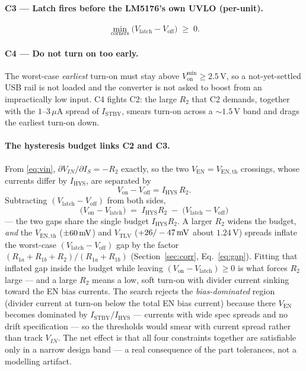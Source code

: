 \documentclass[11pt]{article}
\newcommand{\volt}{\mathrm{V}}\newcommand{\ampere}{\mathrm{A}}
\newcommand{\micro}{\mu}\newcommand{\nano}{\mathrm{n}}
\newcommand{\SI}[2]{\ensuremath{#1\,#2}}
\newcommand{\SIrange}[3]{\ensuremath{#1\text{--}#2\,#3}}
\newcommand{\Ven}{V_{\mathrm{EN}}}
\newcommand{\Vtlv}{V_{\mathrm{TLV}}}
\newcommand{\Vth}{V_{\mathrm{EN,th}}}
\newcommand{\Istby}{I_{\mathrm{STBY}}}
\newcommand{\Ihys}{I_{\mathrm{HYS}}}
\newcommand{\Rone}{R_{1a}}
\newcommand{\Rtwo}{R_{1b}}
\newcommand{\Rt}{R_{2}}
\newcommand{\Von}{V_{\mathrm{on}}}
\newcommand{\Voff}{V_{\mathrm{off}}}
\newcommand{\Vlatch}{V_{\mathrm{latch}}}
\begin{document}
\paragraph{C3 --- Latch fires before the LM5176's own UVLO (per-unit).}
\begin{equation}
\min_{\text{corners}}\big(\Vlatch-\Voff\big)\;\ge\;0 .
\label{eq:c3}
\end{equation}

\paragraph{C4 --- Do not turn on too early.}
The worst-case \emph{earliest} turn-on must stay above
$V_{\mathrm{on}}^{\min}\ge\SI{2.5}{\volt}$, so a not-yet-settled USB rail is not
loaded and the converter is not asked to boost from an impractically low input.
C4 fights C2: the large $\Rt$ that C2 demands, together with the
\SIrange{1}{3}{\micro\ampere} spread of $\Istby$, smears turn-on across a
$\sim$\SI{1.5}{\volt} band and drags the earliest turn-on down.

\paragraph{The hysteresis budget links C2 and C3.}
From \eqref{eq:vin}, $\partial V_{IN}/\partial I_S=-\Rt$ exactly, so the two
$\Ven=\Vth$ crossings, whose currents differ by $\Ihys$, are separated by
\begin{equation}
\Von-\Voff=\Ihys\,\Rt .
\label{eq:hyst}
\end{equation}
Subtracting $(\Vlatch-\Voff)$ from both sides,
\begin{equation}
\boxed{\;\big(\Von-\Vlatch\big)\;=\;\Ihys\Rt\;-\;\big(\Vlatch-\Voff\big)\;}
\label{eq:budget}
\end{equation}
--- the two gaps share the single budget $\Ihys\Rt$. A larger $\Rt$ widens the
budget, \emph{and} the $\Vth$ ($\pm\SI{60}{\milli\volt}$) and $\Vtlv$
($+26/-\SI{47}{\milli\volt}$ about \SI{1.24}{\volt}) spreads inflate the worst-case
$(\Vlatch-\Voff)$ gap by the factor $(\Rone+\Rtwo+\Rt)/(\Rone+\Rtwo)$
(Section~\ref{sec:corr}, Eq.~\eqref{eq:gap}). Fitting that inflated gap inside
the budget while leaving $(\Von-\Vlatch)\ge0$ is what forces $\Rt$ large ---
and a large $\Rt$ means a low, soft turn-on with divider current sinking toward
the EN bias currents. The search rejects the \emph{bias-dominated} region
(divider current at turn-on below the total EN bias current) because there
$\Ven$ becomes dominated by $\Istby/\Ihys$ --- currents with wide spec spreads
and no drift specification --- so the thresholds would smear with current
spread rather than track $V_{IN}$. The net effect is that all four constraints
together are satisfiable only in a narrow design band --- a real consequence of
the part tolerances, not a modelling artifact.
\end{document}

